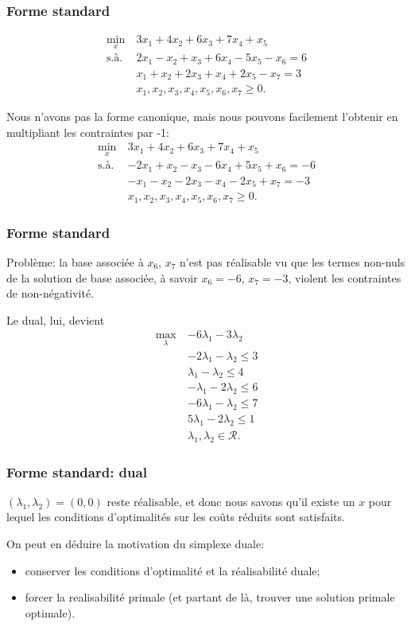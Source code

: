 \documentclass[t,usepdftitle=false]{beamer}
\def\cR{\mathcal{R}}
\begin{document}
\begin{frame}
\frametitle{Forme standard}

\begin{align*}
\min_{x}\ & 3x_1 + 4x_2 + 6x_3 + 7x_4 + x_5 \\
\mbox{s.à. } & 2x_1 - x_2 + x_3 +6x_4 - 5x_5 - x_6 = 6 \\
& x_1 + x_2 + 2x_3 + x_4 + 2x_5 - x_7 = 3 \\
& x_1, x_2, x_3, x_4, x_5, x_6, x_7 \geq 0.
\end{align*}

Nous n'avons pas la forme canonique, mais nous pouvons facilement l'obtenir en multipliant les contraintes par -1:
\begin{align*}
\min_{x}\ & 3x_1 + 4x_2 + 6x_3 + 7x_4 + x_5 \\
\mbox{s.à. } & -2x_1 + x_2 - x_3 - 6x_4 + 5x_5 + x_6 = -6 \\
& -x_1 - x_2 - 2x_3 - x_4 - 2x_5 + x_7 = -3 \\
& x_1, x_2, x_3, x_4, x_5, x_6, x_7 \geq 0.
\end{align*}

\end{frame}

\begin{frame}
\frametitle{Forme standard}

Problème: la base associée à $x_6$, $x_7$ n'est pas réalisable vu que les termes non-nuls de la solution de base associée, à savoir $x_6 = -6$, $x_7 = -3$, violent les contraintes de non-négativité.

\mbox{}

Le dual, lui, devient
\begin{align*}
\max_{\lambda}\ & -6\lambda_1 -3\lambda_2 \\
& -2\lambda_1 -\lambda_2 \leq 3 \\
& \lambda_1 -\lambda_2 \leq 4 \\
& -\lambda_1 -2\lambda_2 \leq 6 \\
& -6\lambda_1 -\lambda_2 \leq 7 \\
& 5\lambda_1 -2\lambda_2 \leq 1 \\
& \lambda_1, \lambda_2 \in \cR.
\end{align*}

\end{frame}

\begin{frame}
\frametitle{Forme standard: dual}

$(\lambda_1, \lambda_2) = (0,0)$ reste réalisable, et donc nous savons qu'il existe un $x$ pour lequel les conditions d'optimalités sur les coûts réduits sont satisfaits.

\mbox{}

On peut en déduire la motivation du simplexe duale:
\begin{itemize}
\item
conserver les conditions d'optimalité et la réalisabilité duale;
\item
forcer la realisabilité primale (et partant de là, trouver une solution primale optimale).
\end{itemize}
\end{frame}
\end{document}
